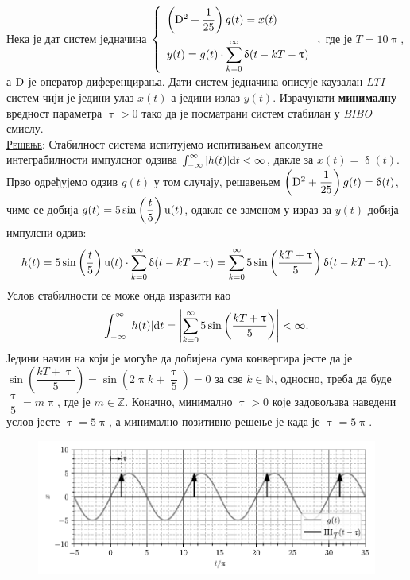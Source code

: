 \PID 
Нека је  
дат систем једначина
$
\displaystyle
\left\lbrace
\begin{array}{l}
\left({\rm D}^2 + \dfrac{1}{25} \right) g(t) = x(t) 
\\[4mm] \displaystyle
y(t) = g(t) \cdot \sum_{k=0}^{\infty} \updelta(t - kT - \uptau)
\end{array} 
\right.,$
где је $T = 10\uppi$, а ${\rm D}$ је оператор 
диференцирања. Дати систем једначина описује
каузалан \textit{LTI} систем чији је једини улаз 
$x(t)$ а једини излаз $y(t)$.
Израчунати \textbf{минималну} вредност параметра $\uptau > 0$ тако да је посматрани систем
стабилан у \textit{BIBO} смислу.
\\[2mm]

\textsc{\underline{Решење}}: Стабилност система испитујемо испитивањем апсолутне интеграбилности импулсног одзива
$\int_{-\infty}^{\infty} |h(t)| {\rm d} t < \infty$, дакле за $x(t) = \updelta(t)$. Прво одређујемо одзив $g(t)$ у том случају,
решавењем $\left({\rm D}^2 + \dfrac{1}{25} \right) g(t) = \updelta(t)$, чиме се добија 
$g(t) =  5 \sin\left(\dfrac{t}{5}\right) {\rm u}(t)$, одакле се заменом у израз за $y(t)$ добија импулсни одзив: 
\begin{equation}
    h(t) = 5 \sin\left(\dfrac{t}{5}\right) \uu(t) \cdot \sum_{k=0}^{\infty} \updelta(t - kT - \uptau) 
         = \sum_{k=0}^{\infty}  5 \sin\left(\dfrac{kT + \uptau}{5}\right) \updelta(t - kT - \uptau). \label{eq:\ID.h}
\end{equation}
Услов стабилности се може онда изразити као
\begin{equation}
    \int_{-\infty}^{\infty} |h(t)| {\rm d} t = \left| \sum_{k=0}^{\infty}  5 \sin\left(\dfrac{kT + \uptau}{5}\right)\right| < \infty.  
\end{equation}
Једини начин на који је могуће да добијена сума конвергира јесте да је
$\sin\left(\dfrac{kT + \uptau}{5}\right) =  \sin\left(2\uppi k + \dfrac{\uptau}{5}\right) = 0$ за све $k \in \mathbb{N}$,
односно, треба да буде $\dfrac{\uptau}{5} = m\uppi$, где је $m \in \mathbb{Z}$. Коначно, минимално $\uptau>0$ које задовољава наведени
услов јесте $\uptau = 5\uppi$, а минимално позитивно решење је када је $\uptau = 5\uppi$.

\begin{figure}[!b]
    \centering
    \includegraphics{fig/delta_odabiranje_sin_edit.pdf }
    \caption{}
    \label{fig:\ID.ideja}
\end{figure}

